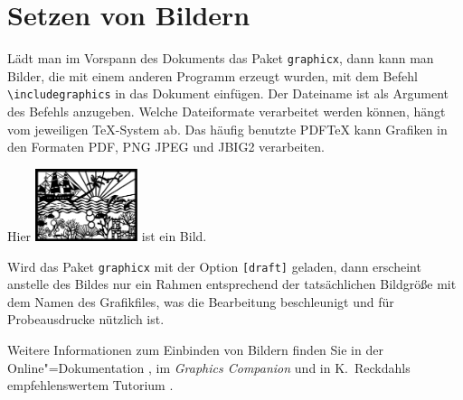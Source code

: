 
\section{Setzen von Bildern} \label{graphics}

Lädt man im Vorspann des Dokuments das Paket \texttt{graphicx}, dann kann man
Bilder, die mit einem anderen Programm erzeugt wurden,  mit dem Befehl
\lstinline|\includegraphics| in das Dokument einfügen. Der Dateiname ist als
Argument des Befehls anzugeben. Welche Dateiformate verarbeitet werden können,
hängt vom jeweiligen \TeX-System ab. Das häufig benutzte PDF\TeX{} kann
Grafiken in den Formaten PDF, PNG JPEG und JBIG2 verarbeiten.



\noindent Wird das Paket \texttt{graphicx} mit der Option \texttt{[draft]} geladen,
dann erscheint anstelle des Bildes nur ein Rahmen entsprechend
der tatsächlichen Bildgröße mit dem Namen des Grafikfiles, 
was die Bearbeitung beschleunigt und für Probeausdrucke nützlich ist.

Weitere Informationen zum Einbinden von Bildern finden Sie in der
Online"=Dokumentation \cite{grfguide}, im \textit{Graphics Companion}
\cite{grfcomp} und in K.~Reckdahls empfehlenswertem  Tutorium \cite{epslatex}.



